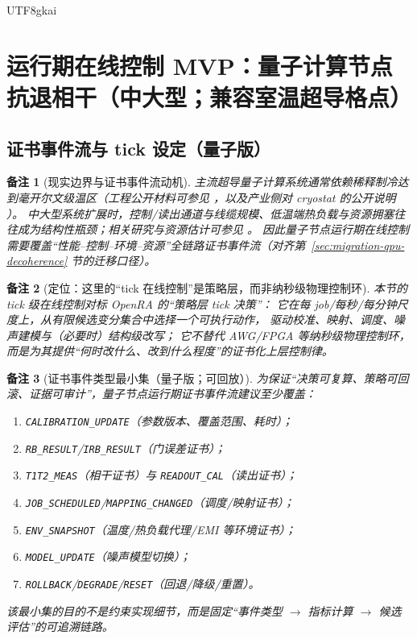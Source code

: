 \documentclass[12pt]{article}
\newtheorem{remark}{备注}[section]
\begin{document}
\begin{CJK*}{UTF8}{gkai}
\section{运行期在线控制 MVP：量子计算节点抗退相干（中大型；兼容室温超导格点）}
\label{sec:online-qpu-mvp}

\subsection{证书事件流与 tick 设定（量子版）}
\label{sec:online-qpu-event-tick}

\begin{remark}[现实边界与证书事件流动机]
主流超导量子计算系统通常依赖稀释制冷达到毫开尔文级温区（工程公开材料可参见 \cite{ref_nationalacademies_25196_ch13}，以及产业侧对 cryostat 的公开说明
  \cite{ref_ibm_goldeneye_cryostat}）。
中大型系统扩展时，控制/读出通道与线缆规模、低温端热负载与资源拥塞往往成为结构性瓶颈；相关研究与资源估计可参见 \cite{ref_arxiv_2601_03922}。
因此量子节点运行期在线控制需要覆盖“性能--控制--环境--资源”全链路证书事件流（对齐第~\ref{sec:migration-qpu-decoherence} 节的迁移口径）。
\end{remark}

\begin{remark}[定位：这里的“tick 在线控制”是策略层，而非纳秒级物理控制环]
本节的 tick 级在线控制对标 \textsf{OpenRA} 的“策略层 tick 决策”：
它在每 job/每秒/每分钟尺度上，从有限候选变分集合中选择一个可执行动作，
驱动校准、映射、调度、噪声建模与（必要时）结构级改写；
它不替代 AWG/FPGA 等纳秒级物理控制环，而是为其提供“何时改什么、改到什么程度”的证书化上层控制律。
\end{remark}

\begin{remark}[证书事件类型最小集（量子版；可回放）]
为保证“决策可复算、策略可回滚、证据可审计”，量子节点运行期证书事件流建议至少覆盖：
\begin{enumerate}
  \item \texttt{CALIBRATION\_UPDATE}（参数版本、覆盖范围、耗时）；
  \item \texttt{RB\_RESULT}/\texttt{IRB\_RESULT}（门误差证书）；
  \item \texttt{T1T2\_MEAS}（相干证书）与 \texttt{READOUT\_CAL}（读出证书）；
  \item \texttt{JOB\_SCHEDULED}/\texttt{MAPPING\_CHANGED}（调度/映射证书）；
  \item \texttt{ENV\_SNAPSHOT}（温度/热负载代理/EMI 等环境证书）；
  \item \texttt{MODEL\_UPDATE}（噪声模型切换）；
  \item \texttt{ROLLBACK}/\texttt{DEGRADE}/\texttt{RESET}（回退/降级/重置）。
\end{enumerate}
该最小集的目的不是约束实现细节，而是固定“事件类型 $\to$ 指标计算 $\to$ 候选评估”的可追溯链路。
\end{remark}


\end{CJK*}
\end{document}
